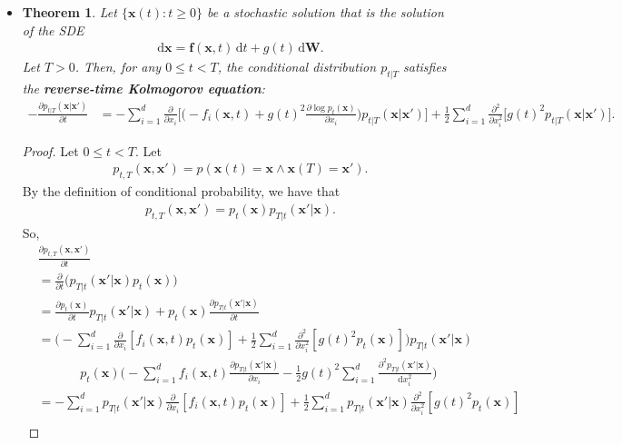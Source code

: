 \documentclass[10pt]{article}
\newtheorem{theorem}[lemma]{Theorem}
\newcommand{\dee}{\mathrm{d}}
\newcommand{\ve}[1]{\mathbf{#1}}
\begin{document}
\begin{itemize}
  \item \begin{theorem}
    Let $\{ \ve{x}(t) : t \geq 0 \}$ be a stochastic solution that is the solution of the SDE
    \begin{align*}
      \dee \ve{x} = \ve{f}(\ve{x},t)\, \dee t + g(t)\, \dee\ve{W}.
    \end{align*}
    Let $T > 0$. Then, for any $0 \leq t < T$, the conditional distribution $p_{t|T}$ satisfies the {\bf reverse-time Kolmogorov equation}:
    \begin{align*}
      -\frac{\partial p_{t|T}(\ve{x}|\ve{x}')}{\partial t}
      &= -\sum_{i=1}^d \frac{\partial}{\partial x_i} \bigg[ \bigg( -f_i(\ve{x},t) + g(t)^2 \frac{\partial \log p_t(\ve{x})}{\partial x_i} \bigg) p_{t|T}(\ve{x}|\ve{x}') \bigg] + \frac{1}{2} \sum_{i=1}^d \frac{\partial^2}{\partial x_i^2} \big[g(t)^2 p_{t|T}(\ve{x}|\ve{x}')\big].
    \end{align*}    
  \end{theorem}    
  \begin{proof}
    Let $0 \leq t < T$. Let
    \begin{align*}
      p_{t,T}(\ve{x},\ve{x}') = p(\ve{x}(t) = \ve{x} \wedge \ve{x}(T) = \ve{x}').
    \end{align*}
    By the definition of conditional probability, we have that
    \begin{align*}
      p_{t,T}(\ve{x},\ve{x}') = p_t(\ve{x}) p_{T|t}(\ve{x}'|\ve{x}).
    \end{align*}
    So,
    \begin{align*}
      &\frac{\partial p_{t,T}(\ve{x},\ve{x}')}{\partial t} \\
      &= \frac{\partial}{\partial t}\big( p_{T|t}(\ve{x}'|\ve{x}) p_t(\ve{x}) \big) \\
      &= \frac{\partial p_t(\ve{x})}{\partial t} p_{T|t}(\ve{x}'|\ve{x}) + p_t(\ve{x}) \frac{\partial p_{T|t}(\ve{x}'|\ve{x})}{\partial t} \\
      &= \bigg( - \sum_{i=1}^d \frac{\partial}{\partial x_i}[f_i(\ve{x},t) p_t(\ve{x})] + \frac{1}{2} \sum_{i=1}^d \frac{\partial^2}{\partial x_i^2} [g(t)^2 p_t(\ve{x})] \bigg) p_{T|t}(\ve{x}'|\ve{x}) \\
      &\phantom{=} \qquad p_t(\ve{x}) \bigg( -\sum_{i=1}^d f_i(\ve{x},t) \frac{\partial p_{T|t}(\ve{x}'|\ve{x})}{\partial x_i} - \frac{1}{2} g(t)^2 \sum_{i=1}^d \frac{\partial^2 p_{T|t}(\ve{x}'|\ve{x})}{\dee x_i^2} \bigg) \\
      &= - \sum_{i=1}^d p_{T|t}(\ve{x}'|\ve{x}) \frac{\partial}{\partial x_i}[f_i(\ve{x},t) p_t(\ve{x})] + \frac{1}{2} \sum_{i=1}^d p_{T|t}(\ve{x}'|\ve{x}) \frac{\partial^2}{\partial x_i^2} [g(t)^2 p_t(\ve{x})] \\

\end{align*}
\end{proof}
\end{itemize}
\end{document}
